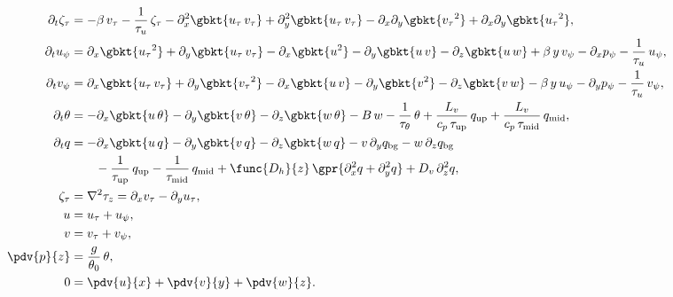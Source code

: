 \begin{subequations}
	\begin{align}
		\partial_t \zeta_\tau &= -\beta\,v_{\tau} - \frac{1}{\tau_u}\,\zeta_{\tau} - \partial_x^2 \gbkt{u_{\tau}\,v_{\tau}} + \partial_y^2 \gbkt{u_{\tau}\,v_{\tau}} - \partial_x \partial_y \gbkt{{v_{\tau}}^2} + \partial_x \partial_y \gbkt{{u_{\tau}}^2},\\
		\partial_t u_{\psi} &= \partial_x \gbkt{{u_\tau}^2} + \partial_y \gbkt{u_{\tau}\,v_{\tau}} - \partial_x \gbkt{u^2} - \partial_y \gbkt{u\,v} - \partial_z \gbkt{u\,w} + \beta\,y\,v_{\psi} - \partial_x p_{\psi} - \frac{1}{\tau_u}\,u_{\psi}, \\
		\partial_t v_{\psi} &= \partial_x \gbkt{u_{\tau}\,v_{\tau}} + \partial_y \gbkt{{v_{\tau}}^2} - \partial_x \gbkt{u\,v} - \partial_y \gbkt{v^2} - \partial_z \gbkt{v\,w} - \beta\,y\,u_{\psi} - \partial_y p_{\psi} - \frac{1}{\tau_u}\,v_{\psi}, \\
		\partial_t \theta &= -\partial_x \gbkt{u\,\theta} - \partial_y \gbkt{v\,\theta} - \partial_z \gbkt{w\,\theta} - B\,w - \frac{1}{\tau_{\theta}}\,\theta + \frac{L_v}{c_p\,\tau_{\text{up}}}\,q_{\text{up}} + \frac{L_v}{c_p\,\tau_{\text{mid}}}\,q_{\text{mid}}, \\
		\partial_t q &= -\partial_x \gbkt{u\,q} - \partial_y \gbkt{v\,q} - \partial_z \gbkt{w\,q} - v\,\partial_y q_{\text{bg}} - w\,\partial_z q_{\text{bg}} \nonumber \\
				&\qquad - \frac{1}{\tau_{\text{up}}}\,q_{\text{up}} - \frac{1}{\tau_{\text{mid}}}\,q_{\text{mid}} + \func{D_h}{z}\,\gpr{\partial_x^2 q + \partial_y^2 q} + D_v\,\partial_z^2 q, \\
		\zeta_{\tau} &= \nabla^2 \tau_z = \partial_x v_{\tau} - \partial_y u_{\tau}, \\
		u &= u_{\tau} + u_{\psi}, \\
		v &= v_{\tau} + v_{\psi}, \\
		\pdv{p}{z} &= \frac{g}{\theta_0}\,\theta, \\
		0 &= \pdv{u}{x} + \pdv{v}{y} + \pdv{w}{z}.
	\end{align}
	\label{eqs:osh19-zeta_tau}
\end{subequations}
